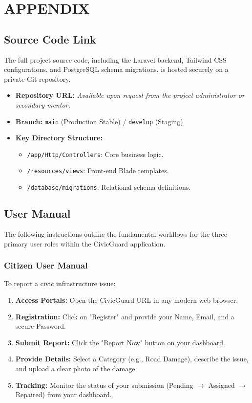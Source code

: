 \chapter{APPENDIX}

\section{Source Code Link}
The full project source code, including the Laravel backend, Tailwind CSS configurations, and PostgreSQL schema migrations, is hosted securely on a private Git repository. 

\begin{itemize}
    \item \textbf{Repository URL:} \textit{Available upon request from the project administrator or secondary mentor.}
    \item \textbf{Branch:} \texttt{main} (Production Stable) / \texttt{develop} (Staging)
    \item \textbf{Key Directory Structure:}
    \begin{itemize}
        \item \texttt{/app/Http/Controllers}: Core business logic.
        \item \texttt{/resources/views}: Front-end Blade templates.
        \item \texttt{/database/migrations}: Relational schema definitions.
    \end{itemize}
\end{itemize}

\section{User Manual}
The following instructions outline the fundamental workflows for the three primary user roles within the CivicGuard application.

\subsection{Citizen User Manual}
To report a civic infrastructure issue:
\begin{enumerate}
    \item \textbf{Access Portals:} Open the CivicGuard URL in any modern web browser.
    \item \textbf{Registration:} Click on "Register" and provide your Name, Email, and a secure Password.
    \item \textbf{Submit Report:} Click the "Report Now" button on your dashboard.
    \item \textbf{Provide Details:} Select a Category (e.g., Road Damage), describe the issue, and upload a clear photo of the damage.
    \item \textbf{Tracking:} Monitor the status of your submission (Pending $\rightarrow$ Assigned $\rightarrow$ Repaired) from your dashboard.
\end{enumerate}

